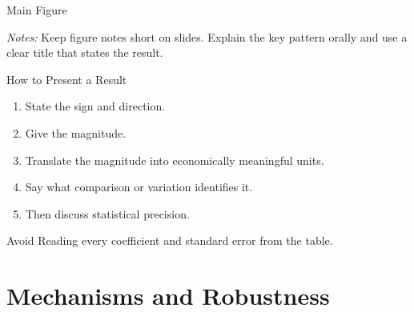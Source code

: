 \documentclass[10pt]{beamer}
\begin{document}
\begin{frame}{Main Figure}
\centering


\vspace{0.5em}
\begin{minipage}{0.85\textwidth}
\footnotesize
\textit{Notes:} Keep figure notes short on slides. Explain the key pattern orally and use a clear title that states the result.
\end{minipage}
\end{frame}

\begin{frame}{How to Present a Result}
\begin{enumerate}
  \item State the sign and direction.
  \item Give the magnitude.
  \item Translate the magnitude into economically meaningful units.
  \item Say what comparison or variation identifies it.
  \item Then discuss statistical precision.
\end{enumerate}

\vspace{0.7em}
\begin{alertblock}{Avoid}
Reading every coefficient and standard error from the table.
\end{alertblock}
\end{frame}

\section{Mechanisms and Robustness}
\end{document}
